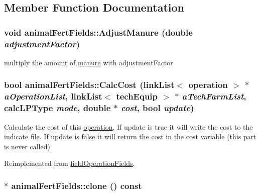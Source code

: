 \subsection{Member Function Documentation}
\hypertarget{classanimal_fert_fields_acd88dcd5d81b63d622a6ff1d30bd72ff}{
\subsubsection[{AdjustManure}]{\setlength{\rightskip}{0pt plus 5cm}void animalFertFields::AdjustManure (double {\em adjustmentFactor})}}
\label{classanimal_fert_fields_acd88dcd5d81b63d622a6ff1d30bd72ff}
multiply the amount of \hyperlink{classmanure}{manure} with adjustmentFactor \hypertarget{classanimal_fert_fields_a45dd2c78a88e638206b14b82616c8e90}{
\subsubsection[{CalcCost}]{\setlength{\rightskip}{0pt plus 5cm}bool animalFertFields::CalcCost ({\bf linkList}$<$ {\bf operation} $>$ $\ast$ {\em aOperationList}, \/  {\bf linkList}$<$ {\bf techEquip} $>$ $\ast$ {\em aTechFarmList}, \/  {\bf calcLPType} {\em mode}, \/  double $\ast$ {\em cost}, \/  bool {\em update})}}
\label{classanimal_fert_fields_a45dd2c78a88e638206b14b82616c8e90}
Calculate the cost of this \hyperlink{classoperation}{operation}. If update is true it will write the cost to the indicate file. If update is false it will return the cost in the cost variable (this part is never called) 

Reimplemented from \hyperlink{classfield_operation_fields_aeb2bce9d4612033dbab366d870e432a6}{fieldOperationFields}.\hypertarget{classanimal_fert_fields_a086028dc45ec7c9624e80ddbb59b5271}{
\subsubsection[{clone}]{ $\ast$ animalFertFields::clone () const}}
\label{classanimal_fert_fields_a086028dc45ec7c9624e80ddbb59b5271}


